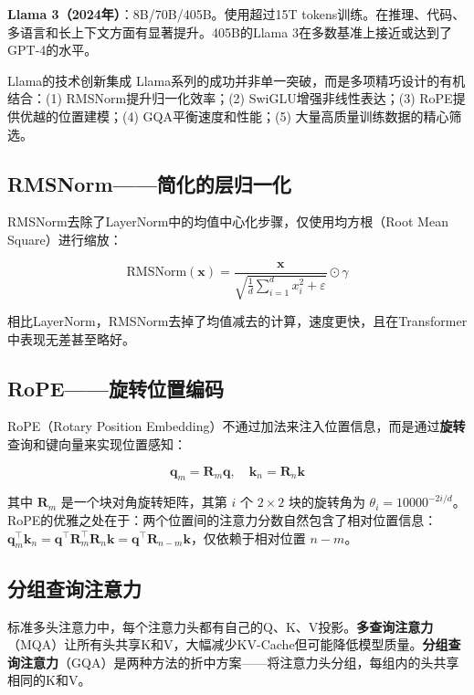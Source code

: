 \textbf{Llama 3（2024年）}：8B/70B/405B。使用超过15T tokens训练。在推理、代码、多语言和长上下文方面有显著提升。405B的Llama 3在多数基准上接近或达到了GPT-4的水平。

\begin{myTheorem}{Llama的技术创新集成}
Llama系列的成功并非单一突破，而是多项精巧设计的有机结合：(1) RMSNorm提升归一化效率；(2) SwiGLU增强非线性表达；(3) RoPE提供优越的位置建模；(4) GQA平衡速度和性能；(5) 大量高质量训练数据的精心筛选。
\end{myTheorem}

\subsection{RMSNorm——简化的层归一化}

RMSNorm去除了LayerNorm中的均值中心化步骤，仅使用均方根（Root Mean Square）进行缩放：

\[
\text{RMSNorm}(\mathbf{x}) = \frac{\mathbf{x}}{\sqrt{\frac{1}{d}\sum_{i=1}^{d} x_i^2 + \varepsilon}} \odot \gamma
\]

相比LayerNorm，RMSNorm去掉了均值减去的计算，速度更快，且在Transformer中表现无差甚至略好。

\subsection{RoPE——旋转位置编码}

RoPE（Rotary Position Embedding）不通过加法来注入位置信息，而是通过\textbf{旋转}查询和键向量来实现位置感知：

\[
\mathbf{q}_m = \mathbf{R}_m\mathbf{q}, \quad \mathbf{k}_n = \mathbf{R}_n\mathbf{k}
\]

其中 $\mathbf{R}_m$ 是一个块对角旋转矩阵，其第 $i$ 个 $2\times2$ 块的旋转角为 $\theta_i = 10000^{-2i/d}$。RoPE的优雅之处在于：两个位置间的注意力分数自然包含了相对位置信息：$\mathbf{q}_m^{\top}\mathbf{k}_n = \mathbf{q}^{\top}\mathbf{R}_m^{\top}\mathbf{R}_n\mathbf{k} = \mathbf{q}^{\top}\mathbf{R}_{n-m}\mathbf{k}$，仅依赖于相对位置 $n-m$。

\subsection{分组查询注意力}

标准多头注意力中，每个注意力头都有自己的Q、K、V投影。\textbf{多查询注意力}（MQA）让所有头共享K和V，大幅减少KV-Cache但可能降低模型质量。\textbf{分组查询注意力}（GQA）是两种方法的折中方案——将注意力头分组，每组内的头共享相同的K和V。


